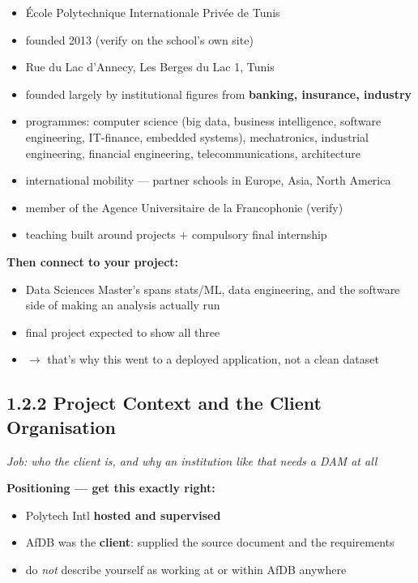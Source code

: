 \documentclass[11pt,a4paper]{article}
\newcommand{\job}[1]{\par\vspace{2pt}\noindent\textcolor{gr}{\textit{Job: #1}}\par\vspace{2pt}}
\begin{document}
\begin{itemize}
\item \'Ecole Polytechnique Internationale Priv\'ee de Tunis
\item founded 2013 \quad\textcolor{gr}{\small(verify on the school's own site)}
\item Rue du Lac d'Annecy, Les Berges du Lac 1, Tunis
\item founded largely by institutional figures from \textbf{banking, insurance, industry}
\item programmes: computer science (big data, business intelligence, software
engineering, IT-finance, embedded systems), mechatronics, industrial engineering,
financial engineering, telecommunications, architecture
\item international mobility --- partner schools in Europe, Asia, North America
\item member of the Agence Universitaire de la Francophonie \textcolor{gr}{\small(verify)}
\item teaching built around projects + compulsory final internship
\end{itemize}

\textbf{Then connect to your project:}
\begin{itemize}
\item Data Sciences Master's spans stats/ML, data engineering, and the software
side of making an analysis actually run
\item final project expected to show all three
\item $\rightarrow$ that's why this went to a deployed application, not a clean dataset
\end{itemize}

\subsection*{1.2.2 Project Context and the Client Organisation}
\job{who the client is, and why an institution like that needs a DAM at all}

\textbf{Positioning --- get this exactly right:}
\begin{itemize}
\item Polytech Intl \textbf{hosted and supervised}
\item AfDB was the \textbf{client}: supplied the source document and the requirements
\item do \emph{not} describe yourself as working at or within AfDB anywhere
\end{itemize}
\end{document}
